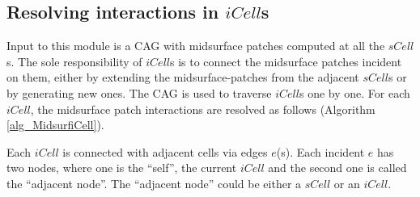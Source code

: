 %
%

\subsection{Resolving interactions in $iCell$s}
\label{sec:icell}
Input to this module is a CAG with midsurface patches computed at all the $sCell$s. The sole responsibility of $iCell$s is to connect the midsurface patches incident on them, either by extending the midsurface-patches from the adjacent $sCell$s or by generating new ones.  The CAG is used to traverse $iCell$s one by one. For each $iCell$, the midsurface patch interactions are resolved as follows (Algorithm \ref{alg_MidsurfiCell}). 

Each $iCell$ is connected with adjacent cells via edges $e$(s).  Each incident $e$ has two nodes, where one is the ``self'', the current $iCell$ and the second one is called the ``adjacent node''.  The ``adjacent node'' could be either a $sCell$ or an $iCell$.  

